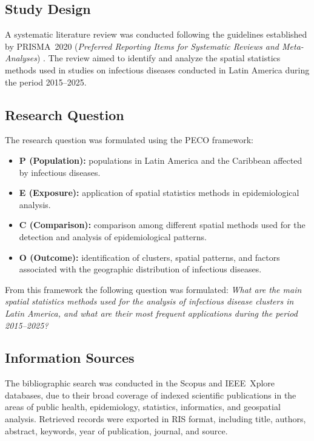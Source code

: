 \documentclass[conference]{IEEEtran}
\begin{document}
\subsection{Study Design}

A systematic literature review was conducted following the
guidelines established by PRISMA~2020 (\textit{Preferred
Reporting Items for Systematic Reviews and Meta-Analyses})
\cite{Page2021}. The review aimed to identify and analyze the
spatial statistics methods used in studies on infectious
diseases conducted in Latin America during the period
2015--2025.

\subsection{Research Question}

The research question was formulated using the PECO framework:

\begin{itemize}
  \item \textbf{P (Population):} populations in Latin America
    and the Caribbean affected by infectious diseases.
  \item \textbf{E (Exposure):} application of spatial
    statistics methods in epidemiological analysis.
  \item \textbf{C (Comparison):} comparison among different
    spatial methods used for the detection and analysis of
    epidemiological patterns.
  \item \textbf{O (Outcome):} identification of clusters,
    spatial patterns, and factors associated with the
    geographic distribution of infectious diseases.
\end{itemize}

From this framework the following question was formulated:
\textit{What are the main spatial statistics methods used for
the analysis of infectious disease clusters in Latin America,
and what are their most frequent applications during the
period 2015--2025?}

\subsection{Information Sources}

The bibliographic search was conducted in the Scopus and
IEEE~Xplore databases, due to their broad coverage of indexed
scientific publications in the areas of public health,
epidemiology, statistics, informatics, and geospatial
analysis. Retrieved records were exported in RIS format,
including title, authors, abstract, keywords, year of
publication, journal, and source.
\end{document}
